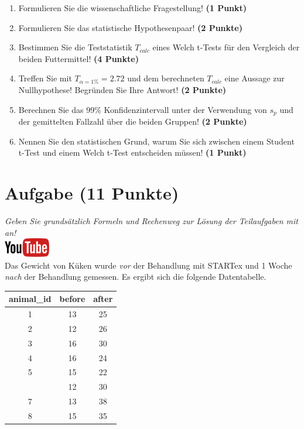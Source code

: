 \documentclass[a4paper, 9pt]{scrartcl}\usepackage[]{graphicx}\usepackage[]{xcolor}
\begin{document}
\begin{enumerate}
  \item Formulieren Sie die wissenschaftliche Fragestellung! \textbf{(1 Punkt)}
  \item Formulieren Sie das statistische Hypothesenpaar! \textbf{(2
      Punkte)}
  \item Bestimmen Sie die Teststatistik $T_{calc}$ eines Welch t-Tests f{\"u}r den
  Vergleich der beiden Futtermittel! \textbf{(4 Punkte)}
\item Treffen Sie mit $T_{\alpha = 1\%} = 2.72$ und dem berechneten $T_{calc}$ eine Aussage
  zur Nullhypothese! Begr{\"u}nden Sie Ihre Antwort! \textbf{(2 Punkte)}
\item Berechnen Sie das 99\% Konfidenzintervall unter der
  Verwendung von $s_p$ und der gemittelten Fallzahl {\"u}ber die beiden Gruppen! \textbf{(2 Punkte)}
\item Nennen Sie den statistischen Grund, warum Sie sich zwischen einem Student t-Test und einem
  Welch t-Test entscheiden m{\"u}ssen! \textbf{(1 Punkt)}
\end{enumerate} 
\clearpage

\section{Aufgabe \hfill (11 Punkte)}

\textit{Geben Sie grunds{\"a}tzlich Formeln und Rechenweg zur L{\"o}sung der
  Teilaufgaben mit an!} \\[1Ex]

\hfill\href{https://youtu.be/QR90zyn0Iz8}{\includegraphics[width =
  2cm]{img/youtube}}\\[1Ex]


Das Gewicht von K{\"u}ken wurde \textit{vor} der Behandlung mit STARTex und 1
Woche \textit{nach} der Behandlung gemessen. Es ergibt sich die folgende
Datentabelle.

\begin{table}[!h]
\centering
\begin{tabular}{ccc}
\toprule
animal\_id & before & after\\
\midrule
1 & 13 & 25\\
2 & 12 & 26\\
3 & 16 & 30\\
4 & 16 & 24\\
5 & 15 & 22\\
\addlinespace
6 & 12 & 30\\
7 & 13 & 38\\
8 & 15 & 35\\
\bottomrule
\end{tabular}
\end{table}
\end{document}
